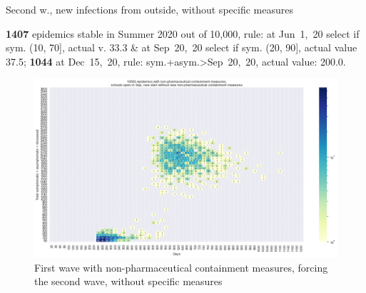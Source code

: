 \documentclass[9pt]{beamer}
\begin{document}
\begin{frame}{Second w., new infections from outside, without specific measures}


\textbf{1407} {\tiny epidemics stable in Summer 2020 out of 10,000, rule: at Jun~1,~20 select if sym. (10, 70], actual v. 33.3 \& at Sep~20,~20 select if sym. (20, 90], actual value 37.5;} \textbf{1044} {\tiny at Dec~15,~20, rule: sym.+asym.>Sep~20,~20, actual value: 200.0.}

\begin{figure}[H]
\center
\includegraphics[scale=0.17]{10kForceWave2.png}
\caption{First wave with non-pharmaceutical containment measures, forcing the second wave, without specific measures}
\label{selForceWave2}
\end{figure}



\end{frame}
\end{document}
